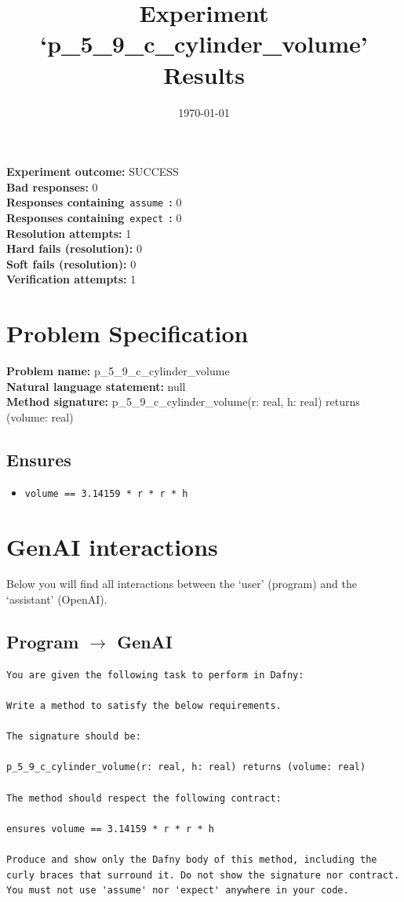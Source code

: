 \documentclass{article}
\begin{document}
\title{Experiment `p\_5\_9\_c\_cylinder\_volume' Results}
\author{\today}
\date{}
\maketitle
\textbf{Experiment outcome: }SUCCESS
\\\textbf{Bad responses: }0
\\\textbf{Responses containing}~\texttt{assume}~\textbf{: }0
\\\textbf{Responses containing}~\texttt{expect}~\textbf{: }0
\\\textbf{Resolution attempts: }1
\\\textbf{Hard fails (resolution): }0
\\\textbf{Soft fails (resolution): }0
\\\textbf{Verification attempts: }1
\section*{Problem Specification}
\textbf{Problem name: }p\_5\_9\_c\_cylinder\_volume
\\\textbf{Natural language statement: }null
\\\textbf{Method signature: }p\_5\_9\_c\_cylinder\_volume(r: real, h: real) returns (volume: real)
\subsection*{Ensures}
\begin{itemize}
\item \texttt{volume == 3.14159 * r * r * h}
\end{itemize}
\clearpage
\section*{GenAI interactions}
Below you will find all interactions between the `user' (program) and the `assistant' (OpenAI).
\subsection*{Program $\rightarrow$ GenAI}
\begin{lstlisting}
You are given the following task to perform in Dafny:

Write a method to satisfy the below requirements.

The signature should be:

p_5_9_c_cylinder_volume(r: real, h: real) returns (volume: real)

The method should respect the following contract:

ensures volume == 3.14159 * r * r * h

Produce and show only the Dafny body of this method, including the curly braces that surround it. Do not show the signature nor contract. You must not use 'assume' nor 'expect' anywhere in your code.
\end{lstlisting}
\end{document}
